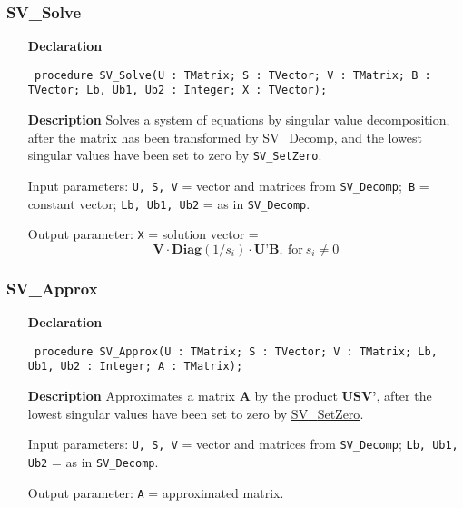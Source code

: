 \documentclass[12pt,a4paper,oneside]{report}
\newcommand{\declarationitem}[1]{\textbf{#1}}
\newcommand{\descriptiontitle}[1]{\textbf{#1}}
\newcommand{\code}[1]{\texttt{#1}}
\begin{document}
\subsubsection{SV{\_}Solve}
\label{usvd-SV_Solve}
\begin{itemize}\item[\declarationitem{Declaration}\hfill]
	\begin{flushleft}
		\code{
			procedure SV{\_}Solve(U : TMatrix; S : TVector; V : TMatrix; B : TVector; Lb, Ub1, Ub2 : Integer; X : TVector);}
		
	\end{flushleft}
	
	\par
	\item[\descriptiontitle{Description}]
	Solves a system of equations by singular value decomposition, after the matrix has been transformed by \hyperref[usvd-SV_Decomp]{SV{\_}Decomp}, and the lowest singular values have been set to zero by \code{SV{\_}SetZero}.
	
	Input parameters: \code{U, S, V} = vector and matrices from \code{SV{\_}Decomp};\code{ B} = constant vector; \code{Lb, Ub1, Ub2} = as in \code{SV{\_}Decomp}.
	
	Output parameter: 
	\code{X} = solution vector = 
	$$
	\textbf{V} \cdot \textbf{Diag}(1/s_i) \cdot \textbf{U'B},\  \textrm{for}\ s_i \ne 0
	$$
\end{itemize}
\subsubsection{SV{\_}Approx}
\label{usvd-SV_Approx}
\begin{itemize}\item[\declarationitem{Declaration}\hfill]
	\begin{flushleft}
		\code{
			procedure SV{\_}Approx(U : TMatrix; S : TVector; V : TMatrix; Lb, Ub1, Ub2 : Integer; A : TMatrix);}
		
	\end{flushleft}
	
	\par
	\item[\descriptiontitle{Description}]
	Approximates a matrix \textbf{A} by the product \textbf{USV'}, after the lowest singular values have been set to zero by \hyperref[usvd-SV_SetZero]{SV{\_}SetZero}.
	
	Input parameters: \code{U, S, V} = vector and matrices from \code{SV{\_}Decomp}; \code{Lb, Ub1, Ub2} = as in \code{SV{\_}Decomp}.
	
	Output parameter: \code{A} = approximated matrix.
	
\end{itemize}
\end{document}
